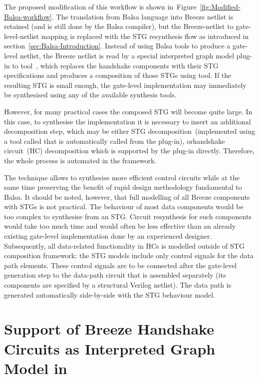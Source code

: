 The proposed modification of this workflow is shown in~Figure~\ref{fig:Modified-Balsa-workflow}.
The translation from Balsa language into Breeze netlist is retained
(and is still done by the Balsa compiler), but the Breeze-netlist
to gate-level-netlist mapping is replaced with the STG resynthesis
flow as introduced in section~\ref{sec:Balsa-Introduction}. Instead of
using Balsa tools to produce a gate-level netlist, the Breeze netlist
is read by a special interpreted graph model plug-in to tool~\cite{DBLP:conf/apn/PoliakovKY09}, which replaces the handshake
components with their STG specifications and produces a composition
of those STGs using  tool. If the resulting STG is small
enough, the gate-level implementation may immediately be synthesised
using any of the available synthesis tools.

However, for many practical cases the composed STG will become quite
large. In this case, to synthesise the implementation it is necessary
to insert an additional decomposition step, which may be either STG
decomposition~(implemented using a tool called \cite{DesiJ}
that is automatically called from the plug-in), or\noun{ }handshake
circuit~(HC) decomposition which is supported by the plug-in directly.
Therefore, the whole process is automated in the framework.

The technique allows to synthesise more efficient control circuits
while at the same time preserving the benefit of rapid design methodology
fundamental to Balsa. It should be noted, however, that full modelling
of all Breeze components with STGs is not practical. The behaviour
of most data components would be too complex to synthesise from an
STG. Circuit resynthesis for such components would take too much time
and would often be less effective than an already existing gate-level
implementation done by an experienced designer. Subsequently, all
data-related functionality in HCs is modelled outside of STG composition
framework: the STG models include only control signals for the data
path elements. These control signals are to be connected after the
gate-level generation step to the data-path circuit that is assembled
separately (its components are specified by a structural Verilog netlist).
The data path is generated automatically side-by-side with the STG
behaviour model.


\section{Support of Breeze Handshake Circuits as Interpreted Graph Model in
}

